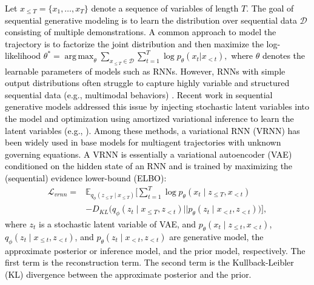\documentclass[journal]{IEEEtran}
\DeclareMathOperator*{\argmax}{arg\,max}
\newcommand{\eq}[1]{\begin{align}#1\end{align}}
\begin{document}
\textcolor{black}{
Let $x_{\leq T} = \{ x_1, \dots, x_T \}$ denote a sequence of variables of length $T$. 
The goal of sequential generative modeling is to learn the distribution over sequential data $\mathcal{D}$ consisting of multiple demonstrations. 
A common approach to model the trajectory is to factorize the joint distribution and then maximize the log-likelihood 
%
$\theta^* = \argmax_{\theta} \sum_{x_{\leq T} \in \mathcal D} \sum_{t=1}^T \log p_{\theta} (x_t | x_{<t}),$ %
%
where $\theta$ denotes the learnable parameters of models such as RNNs.
However, RNNs with simple output distributions often struggle to capture highly variable and structured sequential data (e.g., multimodal behaviors) \cite{Zhan19}. 
Recent work in sequential generative models addressed this issue by injecting stochastic latent variables into the model and optimization using amortized variational inference to learn the latent variables (e.g., \cite{Chung15,Fraccaro16,Goyal17}). %
%
Among these methods, a variational RNN (VRNN) \cite{Chung15} has been widely used in base models for multiagent trajectories \cite{Yeh19,Zhan19} with unknown governing equations.
A VRNN is essentially a variational autoencoder (VAE) conditioned on the hidden state of an RNN and is trained by maximizing the (sequential) evidence lower-bound (ELBO):
}
\textcolor{black}{
\eq{
\mathcal{L}_{vrnn} =  &  \mathbb{E}_{q_{\phi}(z_{\leq T} \mid x_{\leq T})}\Bigg[ \sum_{t=1}^T \log p_{\theta}(x_t \mid z_{\leq T}, x_{<t}) \nonumber \\
& - D_{KL} \Big( q_{\phi}(z_t \mid x_{\leq T}, z_{<t}) || p_{\theta}(z_t \mid x_{<t}, z_{<t}) \Big) \Bigg], \label{eq:vrnn_elbo} 
}}
\textcolor{black}{where $z_t$ is a stochastic latent variable of VAE, and
$p_{\theta}(x_t \mid z_{\leq t}, x_{<t})$, $q_{\phi}(z_t \mid x_{\leq t}, z_{<t})$, and $p_{\theta}(z_t \mid x_{<t}, z_{<t})$ are generative model, the approximate posterior or inference model, and the prior model, respectively.
The first term is the reconstruction term.
The second term is the Kullback-Leibler (KL) divergence between the approximate posterior and the prior.}
\end{document}
